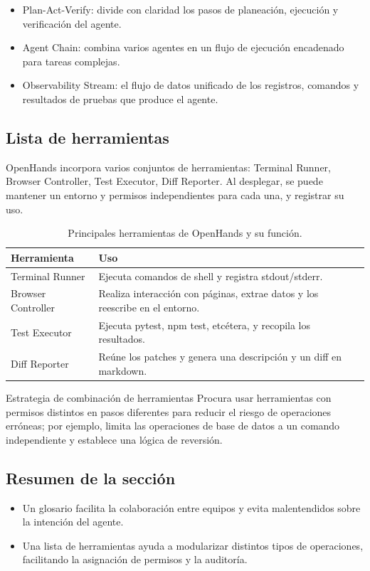 \documentclass[a4paper]{article}
\begin{document}
\begin{itemize}
    \item Plan-Act-Verify: divide con claridad los pasos de planeación, ejecución y verificación del agente.
    \item Agent Chain: combina varios agentes en un flujo de ejecución encadenado para tareas complejas.
    \item Observability Stream: el flujo de datos unificado de los registros, comandos y resultados de pruebas que produce el agente.
\end{itemize}

\subsection{Lista de herramientas}
OpenHands incorpora varios conjuntos de herramientas: Terminal Runner, Browser Controller, Test Executor, Diff Reporter. Al desplegar, se puede mantener un entorno y permisos independientes para cada una, y registrar su uso.

\begin{table}[H]
\centering
\begin{tabular}{p{} p{}}
\toprule
Herramienta & Uso \\
\midrule
Terminal Runner & Ejecuta comandos de shell y registra stdout/stderr. \\
\midrule
Browser Controller & Realiza interacción con páginas, extrae datos y los reescribe en el entorno. \\
\midrule
Test Executor & Ejecuta pytest, npm test, etcétera, y recopila los resultados. \\
\midrule
Diff Reporter & Reúne los patches y genera una descripción y un diff en markdown. \\
\bottomrule
\end{tabular}
\caption{Principales herramientas de OpenHands y su función.}
\end{table}

\begin{knowledgebox}{Estrategia de combinación de herramientas}
Procura usar herramientas con permisos distintos en pasos diferentes para reducir el riesgo de operaciones erróneas; por ejemplo, limita las operaciones de base de datos a un comando independiente y establece una lógica de reversión.
\end{knowledgebox}

\subsection{Resumen de la sección}
\begin{itemize}
    \item Un glosario facilita la colaboración entre equipos y evita malentendidos sobre la intención del agente.
    \item Una lista de herramientas ayuda a modularizar distintos tipos de operaciones, facilitando la asignación de permisos y la auditoría.
\end{itemize}
\end{document}
